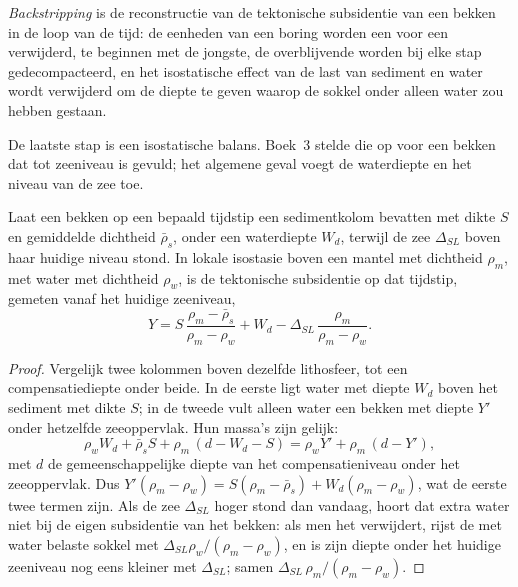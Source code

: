 \begin{definition}[Backstripping]\label{def:b2:basins-compared:backstripping}
\emph{Backstripping} is de reconstructie van de tektonische subsidentie van een
bekken in de loop van de tijd: de eenheden van een boring worden een voor een verwijderd, te beginnen met de jongste, de
overblijvende worden bij elke stap gedecompacteerd, en het isostatische effect van de last van sediment en water
wordt verwijderd om de diepte te geven waarop de sokkel onder alleen water zou hebben gestaan.
\end{definition}

De laatste stap is een isostatische balans. Boek~3 stelde die op voor een bekken dat tot zeeniveau is gevuld;
het algemene geval voegt de waterdiepte en het niveau van de zee toe.

\begin{proposition}\label{prop:b2:basins-compared:backstrip}
Laat een bekken op een bepaald tijdstip een sedimentkolom bevatten met dikte $S$ en gemiddelde dichtheid
$\bar\rho_s$, onder een waterdiepte $W_d$, terwijl de zee $\Delta_{SL}$ boven haar huidige
niveau stond. In lokale isostasie boven een mantel met dichtheid $\rho_m$, met water met dichtheid $\rho_w$, is de
tektonische subsidentie op dat tijdstip, gemeten vanaf het huidige zeeniveau,
\[
  Y = S\,\frac{\rho_m - \bar\rho_s}{\rho_m - \rho_w} + W_d
      - \Delta_{SL}\,\frac{\rho_m}{\rho_m - \rho_w}.
\]
\end{proposition}

\begin{proof}
Vergelijk twee kolommen boven dezelfde lithosfeer, tot een compensatiediepte onder beide. In
de eerste ligt water met diepte $W_d$ boven het sediment met dikte $S$; in de tweede vult alleen water
een bekken met diepte $Y'$ onder hetzelfde zeeoppervlak. Hun massa's zijn gelijk:
\[
  \rho_w W_d + \bar\rho_s S + \rho_m\,(d - W_d - S) = \rho_w Y' + \rho_m\,(d - Y'),
\]
met $d$ de gemeenschappelijke diepte van het compensatieniveau onder het zeeoppervlak. Dus
$Y'(\rho_m - \rho_w) = S(\rho_m - \bar\rho_s) + W_d(\rho_m - \rho_w)$, wat de eerste twee
termen zijn. Als de zee $\Delta_{SL}$ hoger stond dan vandaag, hoort dat extra water niet bij de
eigen subsidentie van het bekken: als men het verwijdert, rijst de met water belaste sokkel met
$\Delta_{SL}\rho_w/(\rho_m - \rho_w)$, en is zijn diepte onder het huidige zeeniveau nog eens kleiner met
$\Delta_{SL}$; samen $\Delta_{SL}\,\rho_m/(\rho_m - \rho_w)$.
\end{proof}

